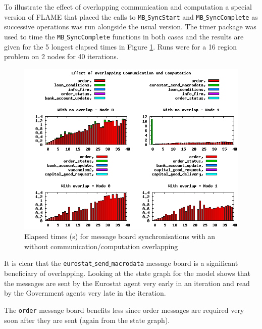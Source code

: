 To illustrate the effect of overlapping communication and computation a special version of FLAME that placed the calls to  \texttt{MB$\_$SyncStart} and \texttt{MB$\_$SyncComplete} as successive operations was run alongside the usual version. The timer package was used to time the \texttt{MB$\_$SyncComplete} functions in both cases and the results are given for the 5 longest elapsed times in Figure \ref{fig:overlap}. Runs were for a 16 region problem on 2 nodes for 40 iterations. 

\begin{figure}[ht]
 \centering
  \includegraphics[width=450pt]{overlap.png}
 \caption{Elapsed times (s) for message board synchronisations with an without communication/computation overlapping}
 \label{fig:overlap}
\end{figure}

It is clear that the \texttt{eurostat$\_$send$\_$macrodata} message board is a significant beneficiary of overlapping. Looking at the state graph for the model shows that the messages are sent by the Eurostat agent very early in an iteration and read by the Government agents very late in the iteration.

The \texttt{order} message board benefits less since order messages are required very soon after they are sent (again from the state graph).






 
